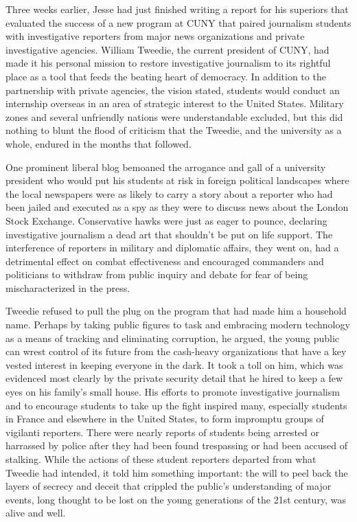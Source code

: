 Three weeks earlier, Jesse had just finished writing a report for his superiors that evaluated the success of a new program at CUNY that paired journalism students with investigative reporters from major news organizations and private investigative agencies.  William Tweedie, the current president of CUNY, had made it his personal mission to restore investigative journalism to its rightful place as a tool that feeds the beating heart of democracy.  In addition to the partnership with private agencies, the vision stated, students would conduct an internship overseas in an area of strategic interest to the United States.  Military zones and several unfriendly nations were understandable excluded, but this did nothing to blunt the flood of criticism that the Tweedie, and the university as a whole, endured in the months that followed.

One prominent liberal blog bemoaned the arrogance and gall of a university president who would put his students at risk in foreign political landscapes where the local newspapers were as likely to carry a story about a reporter who had been jailed and executed as a spy as they were to discuss news about the London Stock Exchange.  Conservative hawks were just as eager to pounce, declaring investigative journalism a dead art that shouldn't be put on life support.  The interference of reporters in military and diplomatic affairs, they went on, had a detrimental effect on combat effectiveness and encouraged commanders and politicians to withdraw from public inquiry and debate for fear of being mischaracterized in the press.

Tweedie refused to pull the plug on the program that had made him a household name.  Perhaps by taking public figures to task and embracing modern technology as a means of tracking and eliminating corruption, he argued, the young public can wrest control of its future from the cash-heavy organizations that have a key vested interest in keeping everyone in the dark.  It took a toll on him, which was evidenced most clearly by the private security detail that he hired to keep a few eyes on his family's small house.  His efforts to promote investigative journalism and to encourage students to take up the fight inspired many, especially students in France and elsewhere in the United States, to form impromptu groups of vigilanti reporters.  There were nearly reports of students being arrested or harrassed by police after they had been found trespassing or had been accused of stalking.  While the actions of these student reporters departed from what Tweedie had intended, it told him something important: the will to peel back the layers of secrecy and deceit that crippled the public's understanding of major events, long thought to be lost on the young generations of the 21st century, was alive and well.

